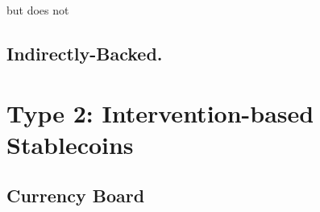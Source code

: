  but does not 




\subsection{Indirectly-Backed.}


\section{Type 2: Intervention-based Stablecoins}
\label{sec:t2}



\subsection{Currency Board}


